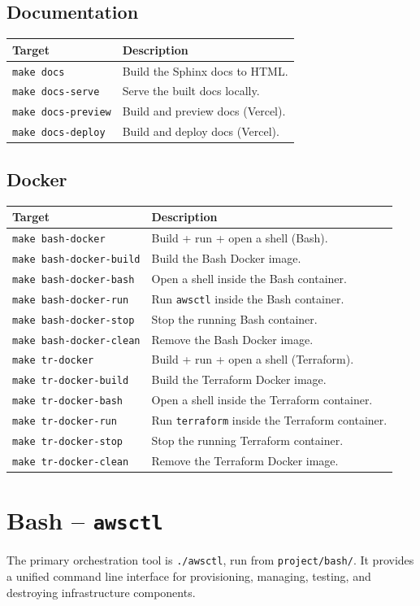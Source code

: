 \documentclass[11pt,a4paper]{report}
\newcommand{\techtable}[3]{%
\begin{center}
\renewcommand{\arraystretch}{1.3}
\begin{tabularx}{\linewidth}{l X}
\toprule
\textbf{#2} & \textbf{#3} \\
\midrule
#1
\bottomrule
\end{tabularx}
\end{center}
}
\begin{document}
\subsection{Documentation}

\techtable{
\texttt{make docs} & Build the Sphinx docs to HTML. \\
\texttt{make docs-serve} & Serve the built docs locally. \\
\texttt{make docs-preview} & Build and preview docs (Vercel). \\
\texttt{make docs-deploy} & Build and deploy docs (Vercel). \\
}{Target}{Description}

\subsection{Docker}

\techtable{
\texttt{make bash-docker} & Build + run + open a shell (Bash). \\
\texttt{make bash-docker-build} & Build the Bash Docker image. \\
\texttt{make bash-docker-bash} & Open a shell inside the Bash container. \\
\texttt{make bash-docker-run} & Run \texttt{awsctl} inside the Bash container. \\
\texttt{make bash-docker-stop} & Stop the running Bash container. \\
\texttt{make bash-docker-clean} & Remove the Bash Docker image. \\
\texttt{make tr-docker} & Build + run + open a shell (Terraform). \\
\texttt{make tr-docker-build} & Build the Terraform Docker image. \\
\texttt{make tr-docker-bash} & Open a shell inside the Terraform container. \\
\texttt{make tr-docker-run} & Run \texttt{terraform} inside the Terraform container. \\
\texttt{make tr-docker-stop} & Stop the running Terraform container. \\
\texttt{make tr-docker-clean} & Remove the Terraform Docker image. \\
}{Target}{Description}

\section{Bash -- \texttt{awsctl}}

The primary orchestration tool is \texttt{./awsctl}, run from
\texttt{project/bash/}. It provides a unified command line interface for
provisioning, managing, testing, and destroying infrastructure components.
\end{document}

